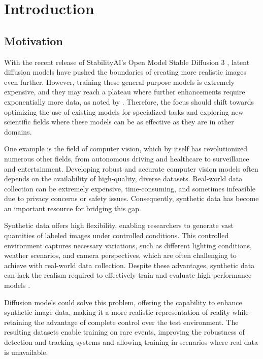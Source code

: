 \chapter{Introduction}
\label{ch:introduction}

\section{Motivation}
With the recent release of StabilityAI's Open Model Stable Diffusion 3 \cite{esser2024scalingrectifiedflowtransformers}, latent diffusion models have pushed the boundaries of creating more realistic images even further. However, training these general-purpose models is extremely expensive, and they may reach a plateau where further enhancements require exponentially more data, as noted by \cite{udandarao2024zeroshotexponentialdatapretraining}. Therefore, the focus should shift towards optimizing the use of existing models for specialized tasks and exploring new scientific fields where these models can be as effective as they are in other domains.

One example is the field of computer vision, which by itself has revolutionized numerous other fields, from autonomous driving and healthcare to surveillance and entertainment. Developing robust and accurate computer vision models often depends on the availability of high-quality, diverse datasets. Real-world data collection can be extremely expensive, time-consuming, and sometimes infeasible due to privacy concerns or safety issues. Consequently, synthetic data has become an important resource for bridging this gap.

Synthetic data offers high flexibility, enabling researchers to generate vast quantities of labeled images under controlled conditions. This controlled environment captures necessary variations, such as different lighting conditions, weather scenarios, and camera perspectives, which are often challenging to achieve with real-world data collection. Despite these advantages, synthetic data can lack the realism required to effectively train and evaluate high-performance models \cite{zhou2017unsupervisedlearningdepthegomotion}.

Diffusion models could solve this problem, offering the capability to enhance synthetic image data, making it a more realistic representation of reality while retaining the advantage of complete control over the test environment. The resulting datasets enable training on rare events, improving the robustness of detection and tracking systems and allowing training in scenarios where real data is unavailable.

